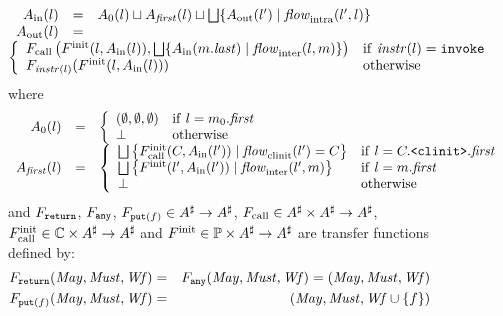 \documentclass{entcs}
\newcommand{\clinit}{\ensuremath{\texttt{<clinit>}}}
\newcommand{\may}{\ensuremath{\mathit{May}}}
\newcommand{\must}{\ensuremath{\mathit{Must}}}
\newcommand{\wf}{\ensuremath{\mathit{Wf}}}
\newcommand{\flow}{\mathit{flow}}
\newcommand{\intraflow}{\flow_{\rm intra}}
\newcommand{\interflow}{\flow_{\rm inter}}
\newcommand{\clinitflow}{\flow_{\rm clinit}}
\begin{document}
\begin{figure}
  $$
  \begin{array}{rcl}
    A_\inA(l) &=& A_0(l) \sqcup A_\first(l) \sqcup \bigsqcup \{A_\outA(l')\mid \intraflow(l',l)\} \\
    A_\outA(l) &=\\
    \multicolumn{3}{r}{
      \makebox[.99\linewidth][r]{$\left\{
          \begin{array}[c]{ll}
            F_\callA\left(F^\init(l,A_\inA(l)),\bigsqcup \{A_\inA(m.\last)\mid \interflow(l,m)\}\right) & \mathrm{if}~ \instrAt(l) = \invoke \\
            F_{\instrAt(l)} (F^\init(l,A_\inA(l))) & \mathrm{otherwise}
          \end{array}\right.$}}
  \end{array}
  $$
  where
  $$
  \begin{array}{rcl}
    A_0(l) &=&     \left\{
      \begin{array}{ll}
        (\emptyset,\emptyset,\emptyset) &\mathrm{if}~l=m_0.\first\\
        \bot & \mathrm{otherwise}\\
      \end{array}\right. \\
    A_\first(l) &=&  \left\{
      \begin{array}{ll}
        \bigsqcup \left\{ F^\init_\callA (C,A_\inA(l')) \mid \clinitflow(l')=C\right\} &\mathrm{if}~l=C.\clinit.\first\\
        \bigsqcup \left\{ F^\init(l',A_\inA(l')) \mid \interflow(l',m)\right\} &\mathrm{if}~l=m.\first\\
        \bot & \mathrm{otherwise}
      \end{array}\right. \\
  \end{array}
  $$
  and $F_{\return}$, $F_{\any}$, $F_{\putS(f)}\in A^\sharp\to A^\sharp$, $F_\callA\in A^\sharp\times A^\sharp\to A^\sharp$,
  $F^\init_\callA\in \class\times A^\sharp\to A^\sharp$ and $F^\init\in \ppt\times A^\sharp\to A^\sharp$ are transfer functions defined by:
  \begin{eqnarray*}
    F_{\return} (\may,\must,\wf) &=& F_{\any} (\may,\must,\wf) = (\may,\must,\wf) \\
    F_{\putS(f)} (\may,\must,\wf) &=& (\may,\must,\wf\cup\{f\}) \\
  \end{eqnarray*}\vspace*{-5ex}
  $$
  \begin{array}{l}

\end{array}$$
\end{figure}
\end{document}
